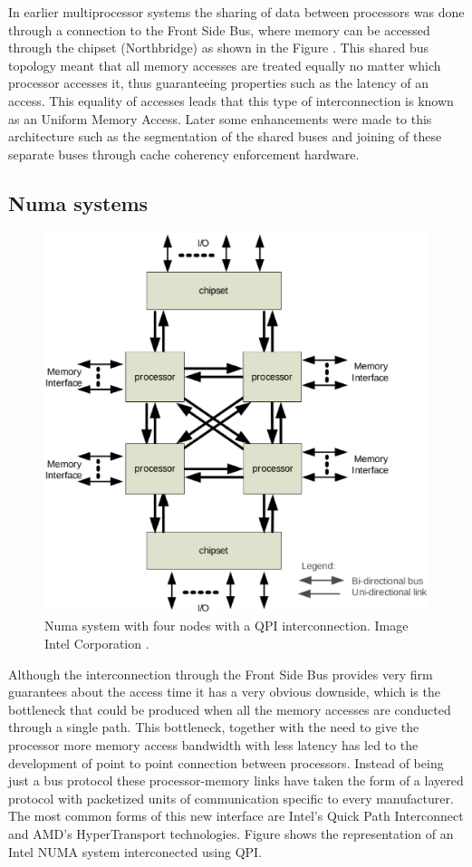 In earlier multiprocessor systems the sharing of data between processors was done through a connection to the Front Side Bus, where memory can be accessed through the chipset (Northbridge) as shown in the Figure \cite{fig:uma1}. This shared bus topology meant that all memory accesses are treated equally no matter which processor accesses it, thus guaranteeing properties such as the latency of an access. This equality of accesses leads that this type of interconnection is known as an Uniform Memory Access. Later some enhancements were made to this architecture such as the segmentation of the shared buses and joining of these separate buses through cache coherency enforcement hardware.

\subsection{Numa systems}\label{subsection:numa}

\begin{figure}
	\centering
		\includegraphics[width=.6\textwidth]{figures/numa-qpi.eps}
		\caption[basic-uma]{Numa system with four nodes with a QPI interconnection. Image Intel Corporation \cite{qpi-intel}. }
		\label{fig:numa1}
\end{figure}

Although the interconnection through the Front Side Bus provides very firm guarantees about the access time it has a very obvious downside, which is the bottleneck that could be produced when all the memory accesses are conducted through a single path. This bottleneck, together with the need to give the processor more memory access bandwidth with less latency has led to the development of point to point connection between processors. Instead of being just a bus protocol these processor-memory links have taken the form of a layered protocol with packetized units of communication specific to every manufacturer. The most common forms of this new interface are Intel's Quick Path Interconnect and AMD's HyperTransport technologies. Figure \cite{fig:numa1} shows the representation of an Intel NUMA system interconected using QPI.

